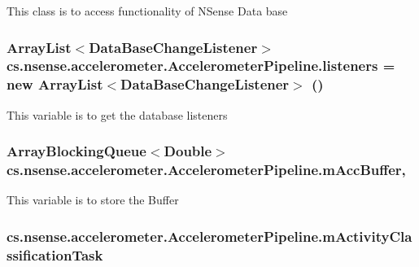 This class is to access functionality of N\-Sense Data base \hypertarget{classcs_1_1nsense_1_1accelerometer_1_1_accelerometer_pipeline_a5fb857adaf4060ad3cd3a45d4f78e23e}{
\subsubsection[{listeners}]{\setlength{\rightskip}{0pt plus 5cm}Array\-List$<${\bf Data\-Base\-Change\-Listener}$>$ cs.\-nsense.\-accelerometer.\-Accelerometer\-Pipeline.\-listeners = new Array\-List$<${\bf Data\-Base\-Change\-Listener}$>$ ()\hspace{0.3cm}{\ttfamily [private]}}}\label{classcs_1_1nsense_1_1accelerometer_1_1_accelerometer_pipeline_a5fb857adaf4060ad3cd3a45d4f78e23e}
This variable is to get the database listeners \hypertarget{classcs_1_1nsense_1_1accelerometer_1_1_accelerometer_pipeline_a2a5fe6f1e2fc156d75891bfcf4d527a1}{
\subsubsection[{m\-Acc\-Buffer}]{\setlength{\rightskip}{0pt plus 5cm}Array\-Blocking\-Queue$<$Double$>$ cs.\-nsense.\-accelerometer.\-Accelerometer\-Pipeline.\-m\-Acc\-Buffer\hspace{0.3cm}{\ttfamily [static]}, {\ttfamily [private]}}}\label{classcs_1_1nsense_1_1accelerometer_1_1_accelerometer_pipeline_a2a5fe6f1e2fc156d75891bfcf4d527a1}
This variable is to store the Buffer \hypertarget{classcs_1_1nsense_1_1accelerometer_1_1_accelerometer_pipeline_a43938dfe068d23472196145f87f16d74}{
\subsubsection[{m\-Activity\-Classification\-Task}]{ cs.\-nsense.\-accelerometer.\-Accelerometer\-Pipeline.\-m\-Activity\-Classification\-Task\hspace{0.3cm}{\ttfamily [private]}}}\label{classcs_1_1nsense_1_1accelerometer_1_1_accelerometer_pipeline_a43938dfe068d23472196145f87f16d74}
